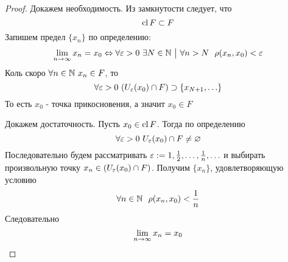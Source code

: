 \begin{proof}
	Докажем необходимость. Из замкнутости следует, что
	\[
		\operatorname{cl} F \subset F
	\]
	Запишем предел $\{x_n\}$ по определению:
	\[
		\liml_{n \to \infty} x_n = x_0 \lra \forall \eps > 0\ \exists N \in \N \such \forall n > N\ \ \rho(x_n, x_0) < \eps
	\]
	Коль скоро $\forall n \in \mathbb{N}\ x_n \in F$, то
	\[
		\forall \varepsilon > 0\ (U_\varepsilon(x_0) \cap F) \supset \{x_{N + 1}, \ldots\}
	\]
	То есть $x_0$ - точка прикосновения, а значит $x_0 \in F$
	
	Докажем достаточность. Пусть $x_0 \in \operatorname{cl} F$. Тогда по определению
	\[
		\forall \varepsilon > 0\ U_\varepsilon(x_0) \cap F \neq \varnothing
	\]
	Последовательно будем рассматривать $\varepsilon := 1, \frac{1}{2}, \ldots, \frac{1}{n}, \ldots$ и выбирать произвольную точку $x_n \in (U_\varepsilon(x_0) \cap F)$. Получим $\{x_n\}$, удовлетворяющую условию
	\[
		\forall n \in \N\ \ \rho(x_n, x_0) < \frac{1}{n}
	\]
	Следовательно
	\[
		\lim\limits_{n \to \infty} x_n = x_0
	\]
\end{proof}